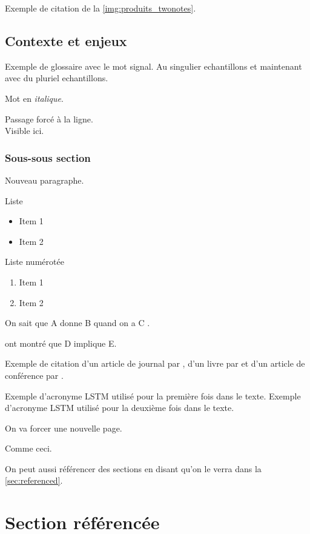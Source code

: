 \documentclass[a4paper]{article}
\begin{document}
Exemple de citation de la \autoref{img:produits_twonotes}.

\subsection{Contexte et enjeux}

Exemple de glossaire avec le mot \gls{signal}.
Au singulier \glspl{echantillon} et maintenant avec du pluriel \glspl{echantillon}.

Mot en \textit{italique}.

Passage forcé à la ligne.\\
Visible ici.

\subsubsection{Sous-sous section}

\par Nouveau paragraphe.

Liste
\begin{itemize}
  \item Item 1
  \item Item 2
\end{itemize}

Liste numérotée
\begin{enumerate}
  \item Item 1
  \item Item 2
\end{enumerate}

On sait que A donne B quand on a C \citep{cho2014}.

\cite{cho2014} ont montré que D implique E.

Exemple de citation d'un article de journal par \cite{Schmitz2019}, d'un livre par \cite{Bracewell1986} et d'un article de conférence par \cite{Wright2019}.

Exemple d'acronyme \ac{LSTM} utilisé pour la première fois dans le texte.
Exemple d'acronyme \ac{LSTM} utilisé pour la deuxième fois dans le texte.

On va forcer une nouvelle page.

\newpage

Comme ceci.

On peut aussi référencer des sections en disant qu'on le verra dans la \autoref{sec:referenced}.

\section{Section référencée}
\label{sec:referenced}
\end{document}
